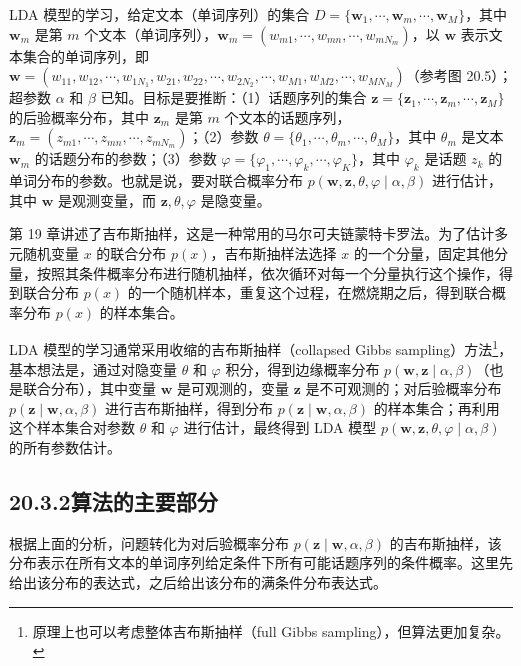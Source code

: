 \documentclass[UTF8, 12pt, fontset=fandol, oneside]{ctexart}
\begin{document}
LDA 模型的学习，给定文本（单词序列）的集合 $D=\{\mathbf{w}_1,\cdots,\mathbf{w}_m,\cdots,\mathbf{w}_M\}$，其中 $\mathbf{w}_m$ 是第 $m$ 个文本（单词序列），$\mathbf{w}_m=(w_{m1},\cdots,w_{mn},\cdots,w_{mN_m})$，以 $\mathbf{w}$ 表示文本集合的单词序列，即 $\mathbf{w}=(w_{11},w_{12},\cdots,w_{1N_1},w_{21},w_{22},\cdots,w_{2N_2},\cdots,w_{M1},w_{M2},\cdots,w_{MN_M})$（参考图 20.5）；超参数 $\alpha$ 和 $\beta$ 已知。目标是要推断：（1）话题序列的集合 $\mathbf{z}=\{\mathbf{z}_1,\cdots,\mathbf{z}_m,\cdots,\mathbf{z}_M\}$ 的后验概率分布，其中 $\mathbf{z}_m$ 是第 $m$ 个文本的话题序列，$\mathbf{z}_m=(z_{m1},\cdots,z_{mn},\cdots,z_{mN_m})$；（2）参数 $\theta=\{\theta_1,\cdots,\theta_m,\cdots,\theta_M\}$，其中 $\theta_m$ 是文本 $\mathbf{w}_m$ 的话题分布的参数；（3）参数 $\varphi=\{\varphi_1,\cdots,\varphi_k,\cdots,\varphi_K\}$，其中 $\varphi_k$ 是话题 $z_k$ 的单词分布的参数。也就是说，要对联合概率分布 $p(\mathbf{w},\mathbf{z},\theta,\varphi\mid\alpha,\beta)$ 进行估计，其中 $\mathbf{w}$ 是观测变量，而 $\mathbf{z},\theta,\varphi$ 是隐变量。

第 19 章讲述了吉布斯抽样，这是一种常用的马尔可夫链蒙特卡罗法。为了估计多元随机变量 $x$ 的联合分布 $p(x)$，吉布斯抽样法选择 $x$ 的一个分量，固定其他分量，按照其条件概率分布进行随机抽样，依次循环对每一个分量执行这个操作，得到联合分布 $p(x)$ 的一个随机样本，重复这个过程，在燃烧期之后，得到联合概率分布 $p(x)$ 的样本集合。

LDA 模型的学习通常采用收缩的吉布斯抽样（collapsed Gibbs sampling）方法\footnote{原理上也可以考虑整体吉布斯抽样（full Gibbs sampling），但算法更加复杂。}，基本想法是，通过对隐变量 $\theta$ 和 $\varphi$ 积分，得到边缘概率分布 $p(\mathbf{w},\mathbf{z}\mid\alpha,\beta)$（也是联合分布），其中变量 $\mathbf{w}$ 是可观测的，变量 $\mathbf{z}$ 是不可观测的；对后验概率分布 $p(\mathbf{z}\mid\mathbf{w},\alpha,\beta)$ 进行吉布斯抽样，得到分布 $p(\mathbf{z}\mid\mathbf{w},\alpha,\beta)$ 的样本集合；再利用这个样本集合对参数 $\theta$ 和 $\varphi$ 进行估计，最终得到 LDA 模型 $p(\mathbf{w},\mathbf{z},\theta,\varphi\mid\alpha,\beta)$ 的所有参数估计。

\subsection*{20.3.2\quad 算法的主要部分}

根据上面的分析，问题转化为对后验概率分布 $p(\mathbf{z}\mid\mathbf{w},\alpha,\beta)$ 的吉布斯抽样，该分布表示在所有文本的单词序列给定条件下所有可能话题序列的条件概率。这里先给出该分布的表达式，之后给出该分布的满条件分布表达式。
\end{document}
